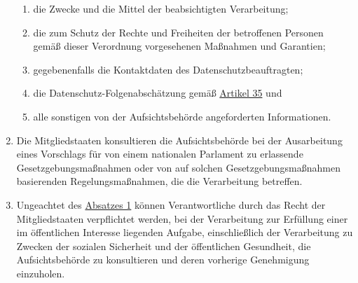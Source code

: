 \begin{enumerate}
\begin{enumerate}
    \item die Zwecke und die Mittel der beabsichtigten Verarbeitung;
    \label{itm:36-3b}

    \item die zum Schutz der Rechte und Freiheiten der betroffenen Personen gemäß dieser Verordnung vorgesehenen
     Maßnahmen und Garantien;
    \label{itm:36-3c}

    \item gegebenenfalls die Kontaktdaten des Datenschutzbeauftragten;
    \label{itm:36-3d}

    \item die Datenschutz-Folgenabschätzung gemäß \hyperref[ch:35]{Artikel 35} und
    \label{itm:36-3e}

    \item alle sonstigen von der Aufsichtsbehörde angeforderten Informationen.
    \label{itm:36-3f}

  \end{enumerate}

  \item Die Mitgliedstaaten konsultieren die Aufsichtsbehörde bei der Ausarbeitung eines Vorschlags für von einem
   nationalen Parlament zu erlassende Gesetzgebungsmaßnahmen oder von auf solchen Gesetzgebungsmaßnahmen basierenden
   Regelungsmaßnahmen, die die Verarbeitung betreffen.
  \label{itm:36-4}

  \item Ungeachtet des \hyperref[itm:36-1]{Absatzes 1} können Verantwortliche durch das Recht der Mitgliedstaaten
   verpflichtet werden, bei der Verarbeitung zur Erfüllung einer im öffentlichen Interesse liegenden Aufgabe,
   einschließlich der Verarbeitung zu Zwecken der sozialen Sicherheit und der öffentlichen Gesundheit, die
   Aufsichtsbehörde zu konsultieren und deren vorherige Genehmigung einzuholen.
  \label{itm:36-5}
   
\end{enumerate}


